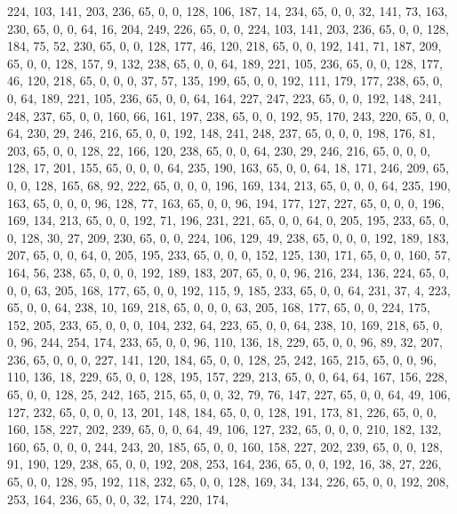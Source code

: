 \begin{DoxyCode}
       224, 103, 141, 203, 236, 65, 0, 0, 128, 106, 187, 14, 234, 65, 0, 0, 32, 141, 73, 163, 230, 65, 0, 0, 64,
       16, 204, 249, 226, 65, 0, 0, 224, 103, 141, 203, 236, 65, 0, 0, 128, 184, 75, 52, 230, 65, 0, 0, 128, 177,
       46, 120, 218, 65, 0, 0, 192, 141, 71, 187, 209, 65, 0, 0, 128, 157, 9, 132, 238, 65, 0, 0, 64, 189, 221, 105,
       236, 65, 0, 0, 128, 177, 46, 120, 218, 65, 0, 0, 0, 37, 57, 135, 199, 65, 0, 0, 192, 111, 179, 177, 238, 65,
       0, 0, 64, 189, 221, 105, 236, 65, 0, 0, 64, 164, 227, 247, 223, 65, 0, 0, 192, 148, 241, 248, 237, 65, 0,
       0, 160, 66, 161, 197, 238, 65, 0, 0, 192, 95, 170, 243, 220, 65, 0, 0, 64, 230, 29, 246, 216, 65, 0, 0, 192,
       148, 241, 248, 237, 65, 0, 0, 0, 198, 176, 81, 203, 65, 0, 0, 128, 22, 166, 120, 238, 65, 0, 0, 64, 230, 29,
       246, 216, 65, 0, 0, 0, 128, 17, 201, 155, 65, 0, 0, 0, 64, 235, 190, 163, 65, 0, 0, 64, 18, 171, 246, 209,
       65, 0, 0, 128, 165, 68, 92, 222, 65, 0, 0, 0, 196, 169, 134, 213, 65, 0, 0, 0, 64, 235, 190, 163, 65, 0, 0,
       0, 96, 128, 77, 163, 65, 0, 0, 96, 194, 177, 127, 227, 65, 0, 0, 0, 196, 169, 134, 213, 65, 0, 0, 192, 71,
       196, 231, 221, 65, 0, 0, 64, 0, 205, 195, 233, 65, 0, 0, 128, 30, 27, 209, 230, 65, 0, 0, 224, 106, 129, 49,
       238, 65, 0, 0, 0, 192, 189, 183, 207, 65, 0, 0, 64, 0, 205, 195, 233, 65, 0, 0, 0, 152, 125, 130, 171, 65,
       0, 0, 160, 57, 164, 56, 238, 65, 0, 0, 0, 192, 189, 183, 207, 65, 0, 0, 96, 216, 234, 136, 224, 65, 0, 0, 0,
       63, 205, 168, 177, 65, 0, 0, 192, 115, 9, 185, 233, 65, 0, 0, 64, 231, 37, 4, 223, 65, 0, 0, 64, 238, 10,
       169, 218, 65, 0, 0, 0, 63, 205, 168, 177, 65, 0, 0, 224, 175, 152, 205, 233, 65, 0, 0, 0, 104, 232, 64, 223,
       65, 0, 0, 64, 238, 10, 169, 218, 65, 0, 0, 96, 244, 254, 174, 233, 65, 0, 0, 96, 110, 136, 18, 229, 65, 0, 0,
       96, 89, 32, 207, 236, 65, 0, 0, 0, 227, 141, 120, 184, 65, 0, 0, 128, 25, 242, 165, 215, 65, 0, 0, 96, 110,
       136, 18, 229, 65, 0, 0, 128, 195, 157, 229, 213, 65, 0, 0, 64, 64, 167, 156, 228, 65, 0, 0, 128, 25, 242,
       165, 215, 65, 0, 0, 32, 79, 76, 147, 227, 65, 0, 0, 64, 49, 106, 127, 232, 65, 0, 0, 0, 13, 201, 148, 184,
       65, 0, 0, 128, 191, 173, 81, 226, 65, 0, 0, 160, 158, 227, 202, 239, 65, 0, 0, 64, 49, 106, 127, 232, 65, 0,
       0, 0, 210, 182, 132, 160, 65, 0, 0, 0, 244, 243, 20, 185, 65, 0, 0, 160, 158, 227, 202, 239, 65, 0, 0, 128,
       91, 190, 129, 238, 65, 0, 0, 192, 208, 253, 164, 236, 65, 0, 0, 192, 16, 38, 27, 226, 65, 0, 0, 128, 95, 192,
       118, 232, 65, 0, 0, 128, 169, 34, 134, 226, 65, 0, 0, 192, 208, 253, 164, 236, 65, 0, 0, 32, 174, 220, 174,

\end{DoxyCode}

